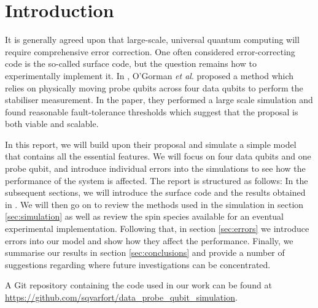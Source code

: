 \section{Introduction} \label{sec:introduction}

It is generally agreed upon that large-scale, universal quantum computing will require comprehensive error correction. One often considered error-correcting code is the so-called surface code, but the question remains how to experimentally implement it. In \cite{OGorman2016}, O'Gorman \textit{et al}. proposed a method which relies on physically moving probe qubits across four data qubits to perform the stabiliser measurement. In the paper, they performed a large scale simulation and found reasonable fault-tolerance thresholds which suggest that the proposal is both viable and scalable. 

In this report, we will build upon their proposal and simulate a simple model that contains all the essential features. We will focus on four data qubits and one probe qubit, and introduce individual errors into the simulations to see how the performance of the system is affected. The report is structured as follows: In the subsequent sections, we will introduce the surface code and the results obtained in \citet{OGorman2016}. We will then go on to review the methods used in the simulation in section \@ \ref{sec:simulation} as well as review the spin species available for an eventual experimental implementation. Following that, in section \@ \ref{sec:errors} we introduce errors into our model and show how they affect the performance. Finally, we summarise our results in section \@ \ref{sec:conclusions} and provide a number of suggestions regarding where future investigations can be concentrated. 

A Git repository containing the code used in our work can be found at \url{https://github.com/sqvarfort/data_probe_qubit_simulation}. 

